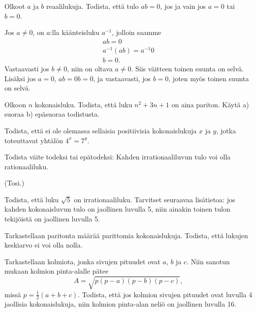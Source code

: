 \begin{kotitehtavasivu}
	\begin{tehtava}
		Olkoot $a$ ja $b$ reaalilukuja. Todista, että tulo $ab = 0$, jos ja vain jos $a=0$ tai $b=0$.
		\begin{vastaus}
			Jos $a \neq 0$, on $a$:lla käänteisluku $a^{-1}$, jolloin saamme
			\begin{align*}
				ab = 0 \\
				a^{-1}(ab) = a^{-1}0 \\
				b = 0.
			\end{align*}
			Vastaavasti jos $b \neq 0$, niin on oltava $a \neq 0$. Siis väitteen toinen suunta on selvä. Lisäksi jos $a = 0$, $ab = 0b = 0$, ja vastaavasti, jos $b = 0$, joten myös toinen suunta on selvä.
		\end{vastaus}
	\end{tehtava}

	\begin{tehtava}
		Olkoon $n$ kokonaisluku. Todista, että luku $n^{2} + 3n + 1$ on aina pariton. Käytä a) suoraa b) epäsuoraa
		todistusta.
	\end{tehtava}

	\begin{tehtava}
		Todista, että ei ole olemassa sellaisia positiivisia kokonaislukuja $x$ ja $y$, jotka toteuttavat
		yhtälön $4^{x} = 7^{y}$.
	\end{tehtava}

	\begin{tehtava}
		Todista väite todeksi tai epätodeksi: Kahden
		irrationaaliluvun tulo voi olla rationaaliluku.
		\begin{vastaus}
			(Tosi.)
		\end{vastaus}
	\end{tehtava}

	\begin{tehtava}
		Todista, että luku $\sqrt{5}$ on irrationaaliluku.
		Tarvitset seuraavaa lisätietoa: jos kahden kokonaisluvun
		tulo on jaollinen luvulla 5, niin ainakin toinen tulon
		tekijöistä on jaollinen luvulla 5.
	\end{tehtava}

	\begin{tehtava}
		Tarkastellaan paritonta määrää parittomia kokonaislukuja.
		Todista, että lukujen keskiarvo ei voi olla nolla.
	\end{tehtava}

	\begin{tehtava}
		Tarkastellaan kolmiota, jonka sivujen pituudet ovat
		$a$, $b$ ja $c$. Niin sanotun  mukaan
		kolmion pinta-alalle pätee \[A = \sqrt{p(p-a)(p-b)(p-c)},\]
		missä $p = \frac{1}{2}(a+b+c)$. Todista, että jos kolmion
		sivujen pituudet ovat luvulla 4 jaollisia kokonaislukuja,
		niin kolmion pinta-alan neliö on jaollinen luvulla 16.
	\end{tehtava}


\end{kotitehtavasivu}
